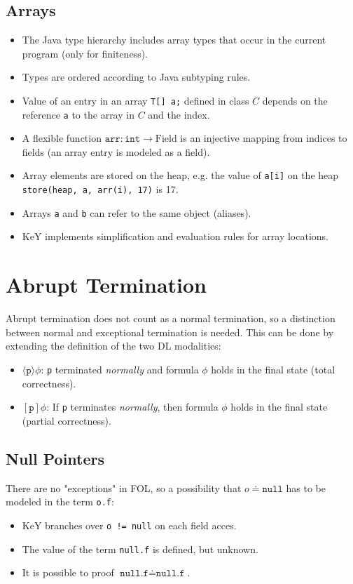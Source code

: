 	\subsection{Arrays}
		\begin{itemize}
			\item The Java type hierarchy includes array types that occur in the current program (only for finiteness).
			\item Types are ordered according to Java subtyping rules.
			\item Value of an entry in an array \texttt{T[] a;} defined in class \(C\) depends on the reference \texttt{a} to the array in \(C\) and the index.
			\item A flexible function \( \texttt{arr} : \texttt{int} \to \textrm{Field} \) is an injective mapping from indices to fields (an array entry is modeled as a field).
			\item Array elements are stored on the heap, e.g. the value of \texttt{a[i]} on the heap \texttt{store(heap, a, arr(i), 17)} is 17.
			\item Arrays \texttt{a} and \texttt{b} can refer to the same object (aliases).
			\item KeY implements simplification and evaluation rules for array locations.
		\end{itemize}

\section{Abrupt Termination}
	Abrupt termination does not count as a normal termination, so a distinction between normal and exceptional termination is needed. This can be done by extending the definition of the two DL modalities:
	\begin{itemize}
		\item \( \langle \texttt{p} \rangle \phi \): \texttt{p} terminated \textit{normally} and formula \(\phi\) holds in the final state (total correctness).
		\item \( [\texttt{p}] \phi \): If \texttt{p} terminates \textit{normally}, then formula \(\phi\) holds in the final state (partial correctness).
	\end{itemize}

	\subsection{Null Pointers}
		There are no "exceptions" in FOL, so a possibility that \( o \doteq \texttt{null} \) has to be modeled in the term \texttt{o.f}:
		\begin{itemize}
			\item KeY branches over \texttt{o != null} on each field acces.
			\item The value of the term \texttt{null.f} is defined, but unknown.
			\item It is possible to proof \( \texttt{null.f} \doteq \texttt{null.f} \).
		\end{itemize}

